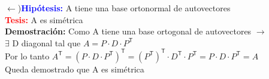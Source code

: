 \documentclass{article}
\begin{document}
\begin{enumerate}
$\leftarrow$){\bfseries \textcolor{blue}{Hipótesis:}} A tiene una base ortonormal de autovectores\\
{\bfseries \textcolor{red}{Tesis:}} A es simétrica\\
\textbf{Demostración:} Como A tiene una base ortogonal de
autovectores $\rightarrow$\\
$\exists$ D diagonal tal que $A = P \cdot D \cdot P ^\mathsf{T} $\\
Por lo tanto $A^\mathsf{T}=(P \cdot D \cdot P ^\mathsf{T})^\mathsf{T}= (P^\mathsf{T})^\mathsf{T} \cdot D^\mathsf{T} \cdot P ^\mathsf{T} = P \cdot D \cdot P ^\mathsf{T} = A$\\
Queda demostrado que A es simétrica
\end{enumerate}
\end{document}
